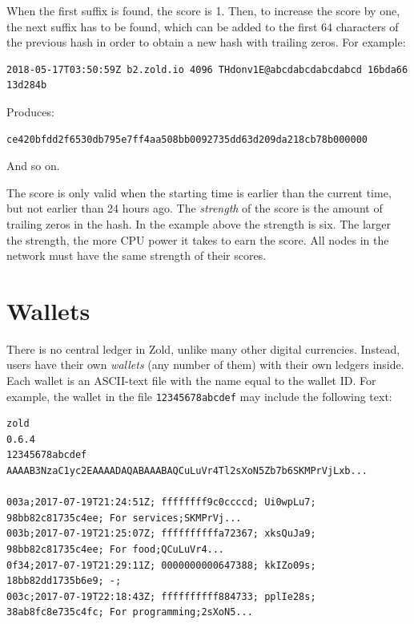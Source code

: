 \documentclass[11pt,oneside]{article}
\newcommand\dd[1]{\colorbox{gray!30}{\texttt{#1}}}
\begin{document}
When the first suffix is found, the score is 1. Then, to
increase the score by one, the next suffix has to be found, which
can be added to the first 64 characters of the previous hash
in order to obtain a new hash with trailing zeros. For example:

\begin{verbatim}
2018-05-17T03:50:59Z b2.zold.io 4096 THdonv1E@abcdabcdabcdabcd 16bda66 13d284b
\end{verbatim}

Produces:

\begin{verbatim}
ce420bfdd2f6530db795e7ff4aa508bb0092735dd63d209da218cb78b000000
\end{verbatim}

And so on.

The score is only valid when the starting time is earlier than
the current time, but not earlier than 24 hours ago. The \emph{strength} of the score
is the amount of trailing zeros in the hash. In the example above the
strength is six. The larger the strength, the more CPU power it takes to earn
the score. All nodes in the network must have the same strength of their scores.


\section{Wallets}\label{sec:wallets}

There is no central ledger in Zold, unlike many other digital currencies.
Instead, users have their own \emph{wallets} (any number of them) with their own ledgers inside.
Each wallet is an ASCII-text file with the name equal to the wallet ID.
For example, the wallet in the file \dd{12345678abcdef} may include
the following text:

\begin{verbatim}
zold
0.6.4
12345678abcdef
AAAAB3NzaC1yc2EAAAADAQABAAABAQCuLuVr4Tl2sXoN5Zb7b6SKMPrVjLxb...

003a;2017-07-19T21:24:51Z; ffffffff9c0ccccd; Ui0wpLu7; 98bb82c81735c4ee; For services;SKMPrVj...
003b;2017-07-19T21:25:07Z; ffffffffffa72367; xksQuJa9; 98bb82c81735c4ee; For food;QCuLuVr4...
0f34;2017-07-19T21:29:11Z; 0000000000647388; kkIZo09s; 18bb82dd1735b6e9; -;
003c;2017-07-19T22:18:43Z; ffffffffff884733; pplIe28s; 38ab8fc8e735c4fc; For programming;2sXoN5...
\end{verbatim}
\end{document}
